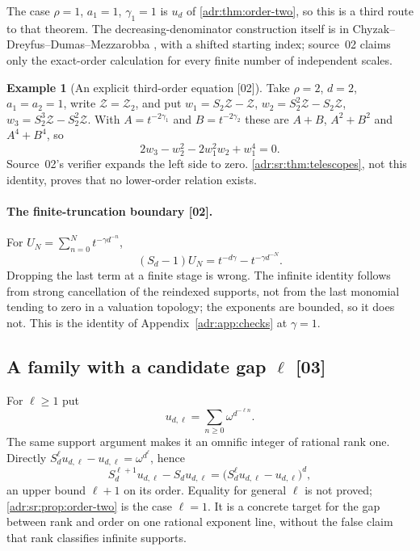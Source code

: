 \documentclass[11pt,letterpaper]{article}
\numberwithin{equation}{section}
\theoremstyle{definition}
\newtheorem{example}[example]{Example}
\theoremstyle{remark}
\newcommand{\src}[1]{\textup{[#1]}}%
\begin{document}
The case $\rho=1$, $a_1=1$, $\gamma_1=1$ is $u_d$ of \cref{adr:thm:order-two},
so this is a third route to that theorem. The decreasing-denominator
construction itself is in Chyzak--Dreyfus--Dumas--Mezzarobba
\cite[Remark~2.18]{CDDM}, with a shifted starting index; source~02 claims only
the exact-order calculation for every finite number of independent scales.

\begin{example}[An explicit third-order equation \src{02}]
\label{adr:sr:ex:third}
Take $\rho=2$, $d=2$, $a_1=a_2=1$, write $\mathcal Z=\mathcal Z_2$, and put
$w_1=S_2\mathcal Z-\mathcal Z$, $w_2=S_2^2\mathcal Z-S_2\mathcal Z$,
$w_3=S_2^3\mathcal Z-S_2^2\mathcal Z$. With $A=t^{-2\gamma_1}$ and
$B=t^{-2\gamma_2}$ these are $A+B$, $A^2+B^2$ and $A^4+B^4$, so
\begin{equation}\label{adr:sr:eq:third}
 2w_3-w_2^2-2w_1^2w_2+w_1^4=0.
\end{equation}
Source~02's verifier expands the left side to zero.
\cref{adr:sr:thm:telescopes}, not this identity, proves that no lower-order
relation exists.
\end{example}

\paragraph{The finite-truncation boundary \src{02}.}
For $U_N=\sum_{n=0}^Nt^{-\gamma d^{-n}}$,
\begin{equation}\label{adr:sr:eq:boundary}
 (S_d-1)U_N=t^{-d\gamma}-t^{-\gamma d^{-N}}.
\end{equation}
Dropping the last term at a finite stage is wrong. The infinite identity
follows from strong cancellation of the reindexed supports, not from the last
monomial tending to zero in a valuation topology; the exponents are bounded,
so it does not. This is the identity of Appendix~\ref{adr:app:checks} at
$\gamma=1$.

\subsection{A family with a candidate gap \texorpdfstring{$\ell$}{l} \src{03}}

For $\ell\ge1$ put
\begin{equation}\label{adr:sr:eq:udl}
 u_{d,\ell}=\sum_{n\ge0}\omega^{d^{-\ell n}}.
\end{equation}
The same support argument makes it an omnific integer of rational rank one.
Directly $S_d^\ell u_{d,\ell}-u_{d,\ell}=\omega^{d^\ell}$, hence
\begin{equation}\label{adr:sr:eq:udl-relation}
 S_d^{\ell+1}u_{d,\ell}-S_du_{d,\ell}=\bigl(S_d^\ell u_{d,\ell}-u_{d,\ell}\bigr)^d,
\end{equation}
an upper bound $\ell+1$ on its order. Equality for general $\ell$ is not
proved; \cref{adr:sr:prop:order-two} is the case $\ell=1$. It is a concrete
target for the gap between rank and order on one rational exponent line,
without the false claim that rank classifies infinite supports.
\end{document}
